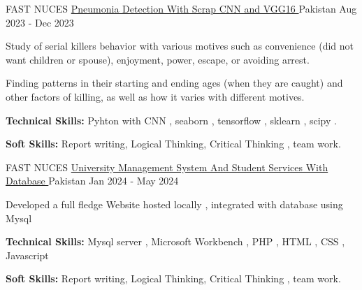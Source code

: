 \begin{cventries}
  \cventry
    {FAST NUCES} %
  {\href{https://github.com/shafeenyousafzaii/Pneumonia_Detection_Team_Project}{Pneumonia Detection With Scrap CNN and VGG16 } } %
    {Pakistan} %
    {Aug 2023 - Dec 2023} %
    {
      \begin{cvitems} %
        \item {Study of serial killers behavior with various motives such as convenience (did not want children or spouse), enjoyment, power, escape, or avoiding arrest.}
        \item {Finding patterns in their starting and ending ages (when they are caught) and other factors of killing, as well as how it varies with different motives.}
        \item {\textbf{Technical Skills:} Pyhton with CNN , seaborn , tensorflow , sklearn , scipy .}
        \item {\textbf{Soft Skills:} Report writing, Logical Thinking, Critical Thinking , team work.}
      \end{cvitems}
    }

  \cventry
    {FAST NUCES} %
  {\href{https://github.com/shafeenyousafzaii/University-Management-System-And-Student-Services}{University Management System And Student Services With Database } } %
    {Pakistan} %
    {Jan 2024 - May 2024} %
    {
      \begin{cvitems} %
        \item {Developed a full fledge Website hosted locally , integrated with database using Mysql }
        \item {\textbf{Technical Skills:} Mysql server , Microsoft Workbench , PHP , HTML , CSS , Javascript}
        \item {\textbf{Soft Skills:} Report writing, Logical Thinking, Critical Thinking , team work.}
      \end{cvitems}
    }

\end{cventries}
